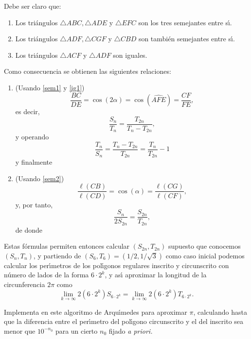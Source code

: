 Debe ser claro que:
\begin{enumerate}
\item \label{sem1}Los tri\'angulos $\triangle ABC,\triangle ADE$ y $\triangle
EFC$ son los tres semejantes entre s\'{\i}.
\item \label{sem2} Los tri\'angulos $\triangle ADF, \triangle CGF$ y $\triangle
CBD$ son tambi\'en
semejantes entre s\'{\i}.
\item \label{ig1}Los tri\'angulos $\triangle ACF$ y $\triangle ADF$ son iguales.
\end{enumerate}
Como consecuencia se obtienen las siguientes relaciones:

\begin{enumerate}
 \item (Usando \ref{sem1} y \ref{ig1})
  \[\frac{BC}{DE}=\cos(2\alpha)=\cos(\widehat{AFE})=\frac{CF}{FE},\]
es decir,
 \[\frac{S_n}{T_n}=\frac{T_{2n}}{T_n-T_{2n}},\]
y operando
 \[\frac{T_n}{S_n}=\frac{T_n-T_{2n}}{T_{2n}}=\frac{T_n}{T_{2n}}-1\]
y finalmente
\begin{center}
\end{center}
 
 \item (Usando \ref{sem2})
 \[\frac{\ell(CB)}{\ell(CD)}=\cos(\alpha)=\frac{\ell(CG)}{\ell(CF)},\]
y, por tanto,
\[\frac{S_n}{2S_{2n}}=\frac{S_{2n}}{T_{2n}},\]
\noindent de donde 
\begin{center}
 \end{center}
\end{enumerate}
Estas f\'ormulas permiten entonces calcular $(S_{2n},T_{2n})$ supuesto que
conocemos $(S_{n},T_{n})$, y partiendo 
de $(S_6,T_6)=(1/2,1/\sqrt{3})$ como caso inicial podemos calcular los
per\'{\i}metros de los pol\'{\i}gonos regulares inscrito y circunscrito con
n\'umero de lados de la forma $6\cdot 2^k$, y as\'{\i} aproximar la longitud de
la circunferencia $2\pi$ como 
\[\lim_{k\to \infty}2(6\cdot 2^k)S_{6\cdot 2^k}=\lim_{k\to \infty}2(6\cdot
2^k)T_{6\cdot 2^k}. \]

\begin{ejer}

Implementa en {\sage} este algoritmo de Arqu\'{\i}medes para aproximar $\pi$,
calculando hasta que la diferencia entre el per\'{\i}metro del pol\'{\i}gono
circunscrito y el del inscrito sea menor que $10^{-n_0}$ para un cierto $n_0$
fijado {\itshape a priori.}
\end{ejer}

